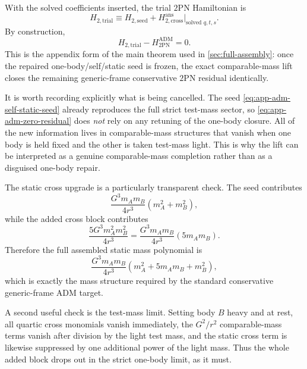 \documentclass[11pt]{article}
\newcommand{\TwoPN}{\mathrm{2PN}}
\newcommand{\ADM}{\mathrm{ADM}}
\begin{document}
With the solved coefficients inserted, the trial \(\TwoPN\) Hamiltonian is
\begin{equation}
H_{2,\mathrm{trial}}
\equiv
H_{2,\mathrm{seed}}+H_{2,\mathrm{cross}}^{\mathrm{ans}}\big|_{\text{solved }q,t,s}.
\label{eq:app-adm-Htrial}
\end{equation}
By construction,
\begin{equation}
H_{2,\mathrm{trial}}-H_{2\mathrm{PN}}^{\ADM}=0.
\label{eq:app-adm-zero-residual}
\end{equation}
This is the appendix form of the main theorem used in
\cref{sec:full-assembly}: once the repaired one-body/self/static seed is frozen, the
exact comparable-mass lift closes the remaining generic-frame conservative \(\TwoPN\)
residual identically.

It is worth recording explicitly what is being cancelled.  The seed
\cref{eq:app-adm-self-static-seed} already reproduces the full strict test-mass sector,
so \cref{eq:app-adm-zero-residual} does \emph{not} rely on any retuning of the one-body
closure.  All of the new information lives in comparable-mass structures that vanish when
one body is held fixed and the other is taken test-mass light.  This is why the lift can
be interpreted as a genuine comparable-mass completion rather than as a disguised
one-body repair.

The static cross upgrade is a particularly transparent check.  The seed contributes
\begin{equation}
\frac{G^3m_A m_B}{4r^3}(m_A^2+m_B^2),
\label{eq:app-adm-static-seed}
\end{equation}
while the added cross block contributes
\begin{equation}
\frac{5G^3m_A^2m_B^2}{4r^3}
=
\frac{G^3m_A m_B}{4r^3}(5m_A m_B).
\label{eq:app-adm-static-cross}
\end{equation}
Therefore the full assembled static mass polynomial is
\begin{equation}
\frac{G^3m_A m_B}{4r^3}(m_A^2+5m_A m_B+m_B^2),
\label{eq:app-adm-static-full}
\end{equation}
which is exactly the mass structure required by the standard conservative generic-frame
\(\ADM\) target.

A second useful check is the test-mass limit.  Setting body \(B\) heavy and at rest,
all quartic cross monomials vanish immediately, the \(G^2/r^2\) comparable-mass terms
vanish after division by the light test mass, and the static cross term is likewise
suppressed by one additional power of the light mass.  Thus the whole added block drops
out in the strict one-body limit, as it must.
\end{document}
